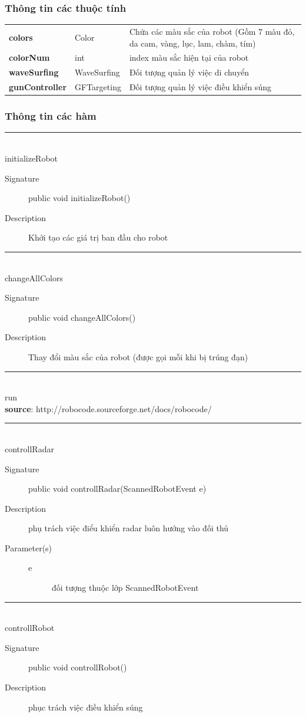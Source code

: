 \documentclass[14pt]{article}
\newcommand{\sep}{\rule{\textwidth}{0.007pt}\\}
\begin{document}
\subsubsection{Thông tin các thuộc tính}
\begin{tabular}{llp{12cm}}
\textbf{colors}&Color&Chứa các màu sắc của robot (Gồm 7 màu đỏ, da cam, vàng, lục, lam, chàm, tím)\\
\textbf{colorNum}&int&index màu sắc hiện tại của robot\\
\textbf{waveSurfing}&WaveSurfing&Đối tượng quản lý việc di chuyển\\
\textbf{gunController}&GFTargeting&Đối tượng quản lý việc điều khiển súng\\
\end{tabular}
\subsubsection{Thông tin các hàm}
\sep
initializeRobot
\begin{description}
	\item[Signature] public void initializeRobot()
	\item[Description] Khởi tạo các giá trị ban đầu cho robot
\end{description}
\sep
changeAllColors
\begin{description}
	\item[Signature] public void changeAllColors()
	\item[Description] Thay đổi màu sắc của robot (được gọi mỗi khi bị trúng đạn)
\end{description}
\sep
run\\
\textbf{source}: http://robocode.sourceforge.net/docs/robocode/\\
\sep
controllRadar
\begin{description}
	\item[Signature] public void controllRadar(ScannedRobotEvent e)
	\item[Description] phụ trách việc điểu khiển radar luôn hướng vào đối thủ
	\item[Parameter(s)]
	\begin{description}
		\item[e] đối tượng thuộc lớp ScannedRobotEvent
	\end{description}
\end{description}
\sep
controllRobot
\begin{description}
	\item[Signature] public void controllRobot()
	\item[Description] phục trách việc điều khiển súng
\end{description}
\end{document}
